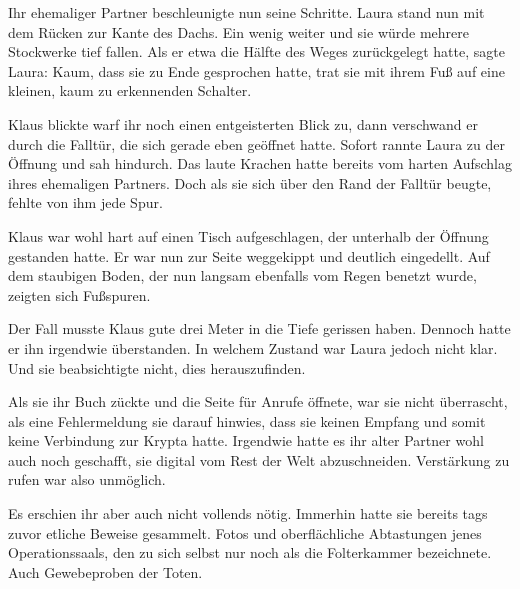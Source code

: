 Ihr ehemaliger Partner beschleunigte nun seine Schritte. Laura stand nun mit dem Rücken zur Kante des Dachs. Ein wenig weiter und sie würde mehrere Stockwerke tief fallen. Als er etwa die Hälfte des Weges zurückgelegt hatte, sagte Laura:  Kaum, dass sie zu Ende gesprochen hatte, trat sie mit ihrem Fuß auf eine kleinen, kaum zu erkennenden Schalter.

\par

Klaus blickte warf ihr noch einen entgeisterten Blick zu, dann verschwand er durch die Falltür, die sich gerade eben geöffnet hatte. Sofort rannte Laura zu der Öffnung und sah hindurch. Das laute Krachen hatte bereits vom harten Aufschlag ihres ehemaligen Partners. Doch als sie sich über den Rand der Falltür beugte, fehlte von ihm jede Spur.

\par

Klaus war wohl hart auf einen Tisch aufgeschlagen, der unterhalb der Öffnung gestanden hatte. Er war nun zur Seite weggekippt und deutlich eingedellt. Auf dem staubigen Boden, der nun langsam ebenfalls vom Regen benetzt wurde, zeigten sich Fußspuren.

\par

Der Fall musste Klaus gute drei Meter in die Tiefe gerissen haben. Dennoch hatte er ihn irgendwie überstanden. In welchem Zustand war Laura jedoch nicht klar. Und sie beabsichtigte nicht, dies herauszufinden.

\par

Als sie ihr Buch zückte und die Seite für Anrufe öffnete, war sie nicht überrascht, als eine Fehlermeldung sie darauf hinwies, dass sie keinen Empfang und somit keine Verbindung zur Krypta hatte. Irgendwie hatte es ihr alter Partner wohl auch noch geschafft, sie digital vom Rest der Welt abzuschneiden. Verstärkung zu rufen war also unmöglich.

\par

Es erschien ihr aber auch nicht vollends nötig. Immerhin hatte sie bereits tags zuvor etliche Beweise gesammelt. Fotos und oberflächliche Abtastungen jenes Operationssaals, den zu sich selbst nur noch als die Folterkammer bezeichnete. Auch Gewebeproben der Toten.

\par

